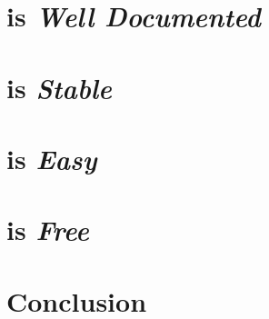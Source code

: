 \documentclass[letterpaper]{article}
\begin{document}
    \section*{\LaTeXe{} is \textit{Well Documented}}

    

    \section*{\LaTeXe{} is \textit{Stable}}

    

    \section*{\LaTeXe{} is \textit{Easy}}

    

    \section*{\LaTeXe{} is \textit{Free}}

    

    

    \section{Conclusion}
    \label{Conclusion}

    \appendix{}
    


    \theendnotes{}

        
    
    \nocite{*}

    \printindex{}
\end{document}
